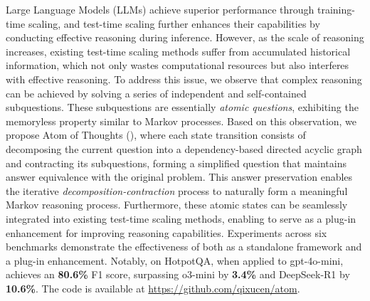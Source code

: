 Large Language Models (LLMs) achieve superior performance through training-time scaling, and test-time scaling further enhances their capabilities by conducting effective reasoning during inference. 
However, as the scale of reasoning increases, existing test-time scaling methods suffer from accumulated historical information, which not only wastes computational resources but also interferes with effective reasoning. 
To address this issue, we observe that complex reasoning can be achieved by solving a series of independent and self-contained subquestions. These subquestions are essentially \textit{atomic questions}, exhibiting the memoryless property similar to Markov processes.
Based on this observation, we propose Atom of Thoughts (\our), where each state transition consists of decomposing the current question into a dependency-based directed acyclic graph and contracting its subquestions, forming a simplified question that maintains answer equivalence with the original problem. This answer preservation enables the iterative \textit{decomposition-contraction} process to naturally form a meaningful Markov reasoning process.
Furthermore, these atomic states can be seamlessly integrated into existing test-time scaling methods, enabling \our to serve as a plug-in enhancement for improving reasoning capabilities.
Experiments across six benchmarks demonstrate the effectiveness of \our both as a standalone framework and a plug-in enhancement. Notably, on HotpotQA, when applied to gpt-4o-mini, \our achieves an \textbf{80.6\%} F1 score, surpassing o3-mini by \textbf{3.4\%} and DeepSeek-R1 by \textbf{10.6\%}. The code is available at \href{https://github.com/qixucen/atom}{https://github.com/qixucen/atom}.